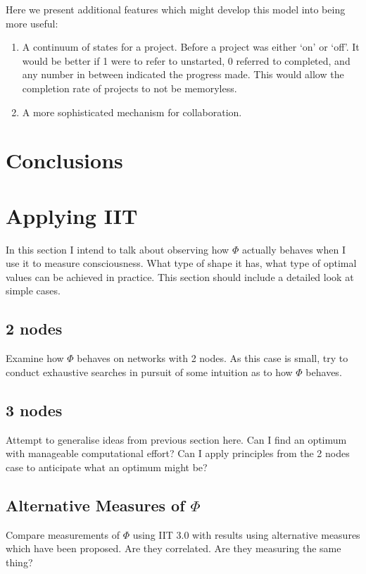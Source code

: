 Here we present additional features which might develop this model into being more useful:

\begin{enumerate}
	\item A continuum of states for a project. Before a project was either `on' or `off'. It would be better if 1 were to refer to unstarted, 0 referred to completed, and any number in between indicated the progress made. This would allow the completion rate of projects to not be memoryless.
	\item A more sophisticated mechanism for collaboration. 
\end{enumerate}

\section{Conclusions}

\section{Applying IIT}
In this section I intend to talk about observing how $\Phi$ actually behaves when I use it to measure consciousness. What type of shape it has, what type of optimal values can be achieved in practice. This section should include a detailed look at simple cases.

\subsection{2 nodes}
Examine how $\Phi$ behaves on networks with 2 nodes. As this case is small, try to conduct exhaustive searches in pursuit of some intuition as to how $\Phi$ behaves.
\subsection{3 nodes}
Attempt to generalise ideas from previous section here. Can I find an optimum with manageable computational effort? Can I apply principles from the 2 nodes case to anticipate what an optimum might be?

\subsection{Alternative Measures of $\Phi$}
Compare measurements of $\Phi$ using IIT 3.0 with results using alternative measures which have been proposed. Are they correlated. Are they measuring the same thing?

